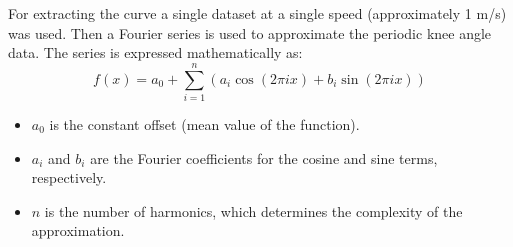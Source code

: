 For extracting the curve a single dataset at a single speed (approximately 1 m/s) was used. Then a Fourier series is used to approximate the periodic knee angle data. The series is expressed mathematically as:
\begin{equation}
f(x) = a_0 + \sum_{i=1}^{n} \left( a_i \cos(2\pi i x) + b_i \sin(2\pi i x) \right)
\end{equation}

\begin{itemize}
    \item \(a_0\) is the constant offset (mean value of the function).
    \item \(a_i\) and \(b_i\) are the Fourier coefficients for the cosine and sine terms, respectively.
    \item \(n\) is the number of harmonics, which determines the complexity of the approximation.
\end{itemize}

